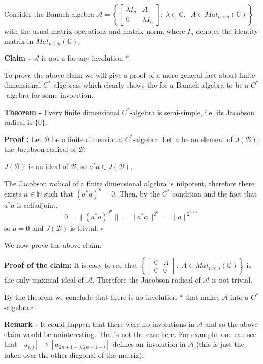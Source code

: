 \documentclass[12pt]{article}
\begin{document}
Consider the Banach algebra $\mathcal{A}= \left\{ 
\begin{bmatrix}
\lambda I_n & A \\
0 & \lambda I_n
\end{bmatrix} :\; \lambda \in \mathbb{C},\;\; A \in Mat_{n \times n}(\mathbb{C}) \right\}$ with the usual matrix operations and matrix norm, where $I_n$ denotes the identity matrix in $Mat_{n \times n}(\mathbb{C})$.

{\bf Claim -} $\mathcal{A}$ is not a  for any involution $*$.

To prove the above claim we will give a  proof of a more general fact about finite dimensional $C^*$-algebras, which clearly shows the  for a Banach algebra to be a $C^*$-algebra for some involution.

{\bf Theorem -} Every finite dimensional $C^*$-algebra is semi-simple, i.e. its Jacobson radical is $\{0\}$.

{\bf Proof :} Let $\mathcal{B}$ be a finite dimensional $C^*$-algebra. Let $a$ be an element of $J(\mathcal{B})$, the Jacobson radical of $\mathcal{B}$.

$J(\mathcal{B})$ is an ideal of $\mathcal{B}$, so $a^*a \in J(\mathcal{B})$.

The Jacobson radical of a finite dimensional algebra is nilpotent, therefore there exists $n \in \mathbb{N}$ such that $(a^*a)^n=0$. Then, by the $C^*$ condition and the fact that $a^*a$ is selfadjoint,
\begin{displaymath}
0 = \|(a^*a)^{2^n}\| = \|a^*a\|^{2^n} = \|a\|^{2^{n+1}}
\end{displaymath}
so $a = 0$ and $J(\mathcal{B})$ is trivial. $\square$

We now prove the above claim.

{\bf Proof of the claim:} It is easy to see that 
$\left\{ 
\begin{bmatrix}
0 & A \\
0 & 0
\end{bmatrix} : \; A \in Mat_{n \times n}(\mathbb{C}) \right\}$ is the only maximal ideal of $\mathcal{A}$. Therefore the Jacobson radical of $\mathcal{A}$ is not trivial.

By the theorem we conclude that there is no involution $*$ that makes $\mathcal{A}$ into a $C^*$-algebra.$\square$

{\bf Remark -} It could happen that there were no involutions in $\mathcal{A}$ and so the above claim would be uninteresting. That's not the case here. For example, one can see that $[a_{i,j}] \longrightarrow [\overline{a}_{2n+1-j,2n+1-i}]$ defines an involution in $\mathcal{A}$ (this is just the  taken over the other diagonal of the matrix).
\end{document}
